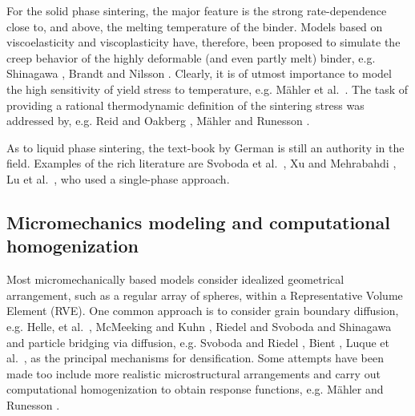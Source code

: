 \documentclass[MikaelDissertation.tex]{subfiles}
\begin{document}
For the solid phase sintering, the major feature is the strong rate-dependence close to, and above, the melting temperature of the binder.
Models based on viscoelasticity and viscoplasticity have, therefore, been proposed to simulate the creep behavior of the highly deformable (and even partly melt) binder, e.g. Shinagawa \cite{shinagawa_finite_1996}, Brandt and Nilsson \cite{brandt_fe-simulation_1998}.
Clearly, it is of utmost importance to model the high sensitivity of yield stress to temperature, e.g. Mähler et al.\ \cite{mahler_modelling_2000}.
The task of providing a rational thermodynamic definition of the sintering stress was addressed by, e.g. Reid and Oakberg \cite{reid_continuum_1990}, Mähler and Runesson \cite{mahler_constitutive_2003}.

As to liquid phase sintering, the text-book by German \cite{german_sintering_1996} is still an authority in the field.
Examples of the rich literature are Svoboda et al.\ \cite{svoboda_model_1996}, Xu and Mehrabahdi \cite{xu_micromechanical_1997}, Lu et al.\ \cite{lu_porosity_2001}, who used a single-phase approach.


\subsection{Micromechanics modeling and computational homogenization}

Most micromechanically based models consider idealized geometrical arrangement, such as a regular array of spheres, within a Representative Volume Element (RVE).
One common approach is to consider grain boundary diffusion, e.g. Helle, et al.\ \cite{helle_hot-isostatic_1985}, McMeeking and Kuhn \cite{mcmeeking_diffusional_1992}, Riedel and Svoboda \cite{riedel_theoretical_1993} and Shinagawa \cite{shinagawa_finite_1996} and particle bridging via diffusion, e.g. Svoboda and Riedel \cite{svoboda_new_1995}, Bient \cite{bient_modeling_2004}, Luque et al.\ \cite{luque_simulation_2005}, as the principal mechanisms for densification.
Some attempts have been made too include more realistic microstructural arrangements and carry out computational homogenization to obtain response functions, e.g. Mähler and Runesson \cite{mahler_modelling_2000}.
\end{document}
